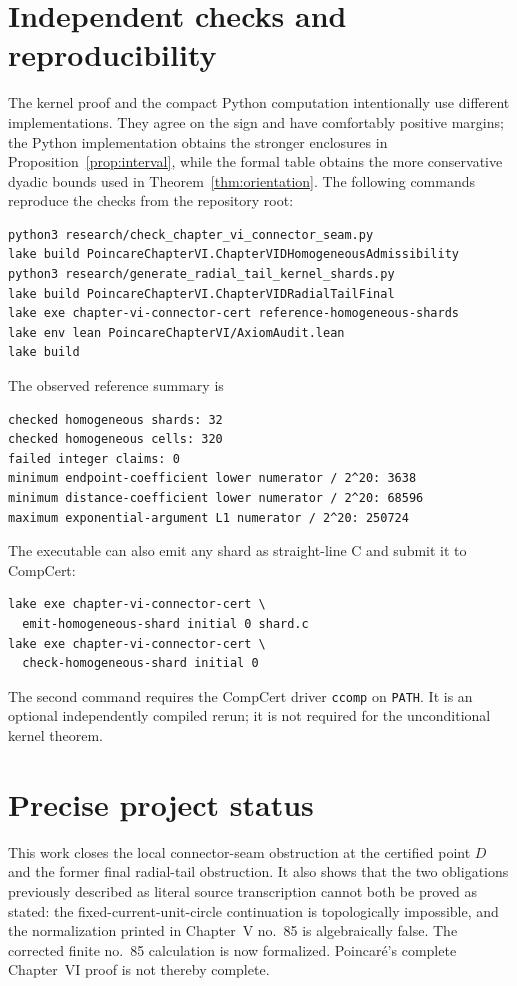\documentclass[11pt]{article}
\begin{document}
\section{Independent checks and reproducibility}

The kernel proof and the compact Python computation intentionally use different implementations.
They agree on the sign and have comfortably positive margins; the Python implementation obtains
the stronger enclosures in Proposition~\ref{prop:interval}, while the formal table obtains the
more conservative dyadic bounds used in Theorem~\ref{thm:orientation}.  The following commands
reproduce the checks from the repository root:

\begin{verbatim}
python3 research/check_chapter_vi_connector_seam.py
lake build PoincareChapterVI.ChapterVIDHomogeneousAdmissibility
python3 research/generate_radial_tail_kernel_shards.py
lake build PoincareChapterVI.ChapterVIDRadialTailFinal
lake exe chapter-vi-connector-cert reference-homogeneous-shards
lake env lean PoincareChapterVI/AxiomAudit.lean
lake build
\end{verbatim}

The observed reference summary is
\begin{verbatim}
checked homogeneous shards: 32
checked homogeneous cells: 320
failed integer claims: 0
minimum endpoint-coefficient lower numerator / 2^20: 3638
minimum distance-coefficient lower numerator / 2^20: 68596
maximum exponential-argument L1 numerator / 2^20: 250724
\end{verbatim}

The executable can also emit any shard as straight-line C and submit it to CompCert:
\begin{verbatim}
lake exe chapter-vi-connector-cert \
  emit-homogeneous-shard initial 0 shard.c
lake exe chapter-vi-connector-cert \
  check-homogeneous-shard initial 0
\end{verbatim}
The second command requires the CompCert driver \texttt{ccomp} on \texttt{PATH}.  It is an
optional independently compiled rerun; it is not required for the unconditional kernel theorem.

\section{Precise project status}

This work closes the local connector-seam obstruction at the certified point \(D\) and the
former final radial-tail obstruction.  It also
shows that the two obligations previously described as literal source transcription cannot both
be proved as stated: the fixed-current-unit-circle continuation is topologically impossible, and
the normalization printed in Chapter~V no.~85 is algebraically false.  The corrected finite
no.~85 calculation is now formalized.  Poincar\'e's complete Chapter~VI proof is not thereby
complete.
\end{document}

